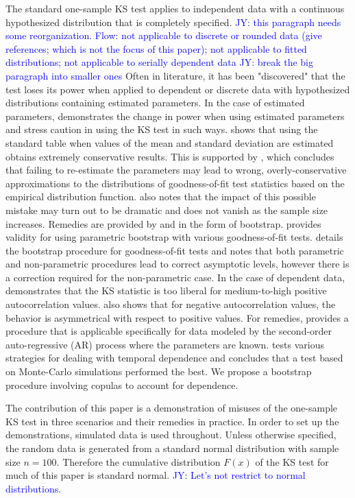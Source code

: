 \documentclass[12pt, letterpaper, titlepage]{article}
\newcommand{\jy}[1]{\textcolor{blue}{JY: #1}}
\begin{document}
The standard one-sample KS test applies to independent data with a continuous
hypothesized distribution that is completely specified.
\jy{this paragraph needs some reorganization.
  Flow: not applicable to discrete or rounded data (give references; which is
  not the focus of this paper);
  not applicable to fitted distributions;
  not applicable to serially dependent data}
\jy{break the big paragraph into smaller ones}
Often in literature, it has been "discovered" that the test loses its power when 
applied to dependent or discrete data with hypothesized distributions containing 
estimated parameters. In the case of estimated parameters, \citet{Steinskog} 
demonstrates the change in power when using estimated parameters and stress caution in 
using the KS test in such ways. \citet{Lilliefors} shows 
that using the standard table when values of the mean and standard deviation are 
estimated obtains extremely conservative results. This is supported by \citet{Capasso}, which 
concludes that failing to re-estimate the parameters may lead to wrong, overly-conservative 
approximations to the distributions of goodness-of-fit test statistics based on the empirical 
distribution function. \citet{Capasso} also notes that the impact of this possible mistake 
may turn out to be dramatic and does not vanish as the sample size increases. Remedies are provided 
by \citet{Genest} and \citet{Babu} in the form of bootstrap. \citet{Genest} provides validity 
for using parametric bootstrap with various goodness-of-fit tests. \citet{Babu} details 
the bootstrap procedure for goodness-of-fit tests and notes that both parametric and 
non-parametric procedures lead to correct asymptotic levels, however there is a correction 
required for the non-parametric case. In the case of dependent data, \citet{Durilleul} demonstrates
that the KS statistic is too liberal for medium-to-high positive autocorrelation values. 
\citet{Durilleul} also shows that for negative autocorrelation values, the behavior is 
asymmetrical with respect to positive values. For remedies, \citet{Weiss} provides a 
procedure that is applicable specifically for data modeled by the second-order auto-regressive (AR) 
process where the parameters are known. \citet{Lanzante} tests various strategies for dealing with 
temporal dependence and concludes that a test based on Monte-Carlo simulations performed the best.
We propose a bootstrap procedure involving copulas to account for dependence.


The contribution of this paper is a demonstration of misuses of the one-sample
KS test in three scenarios and their remedies in practice. In order to set 
up the demonstrations, simulated data is used throughout. Unless otherwise specified, 
the random data is generated from a standard normal distribution with sample size $n = 100$. 
Therefore the cumulative distribution $F(x)$ of the KS test for much of this paper is standard normal.
\jy{Let's not restrict to normal distributions.}
\end{document}

